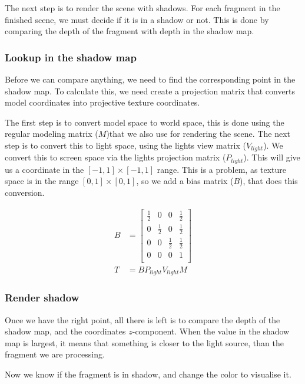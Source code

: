 The next step is to render the scene with shadows. For each fragment
in the finished scene, we must decide if it is in a shadow or
not. This is done by comparing the depth of the fragment with depth in
the shadow map.

\subsubsection*{Lookup in the shadow map}

Before we can compare anything, we need to find the corresponding
point in the shadow map. To calculate this, we need create a
projection matrix that converts model coordinates into projective
texture coordinates.

The first step is to convert model space to world space, this is done
using the regular modeling matrix ($M$)that we also use for rendering
the scene. The next step is to convert this to light space, using the
lights view matrix ($V_{light}$). We convert this to screen space via
the lights projection matrix ($P_{light}$). This will give us a
coordinate in the $[-1,1] \times [-1,1]$ range. This is a problem, as
texture space is in the range $[0,1] \times [0,1]$, so we add a bias
matrix ($B$), that does this conversion.

\begin{align*}
  B &= \begin{bmatrix}
    \frac{1}{2} & 0   & 0   & \frac{1}{2} \\
    0   & \frac{1}{2} & 0   & \frac{1}{2} \\
    0   & 0   & \frac{1}{2} & \frac{1}{2} \\
    0   & 0   & 0   & 1   \\
  \end{bmatrix} \\
  T &= BP_{light}V_{light}M
\end{align*}

\subsubsection*{Render shadow}

Once we have the right point, all there is left is to compare the
depth of the shadow map, and the coordinates $z$-component. When the
value in the shadow map is largest, it means that something is closer
to the light source, than the fragment we are processing.


Now we know if the fragment is in shadow, and change the color
to visualise it.

